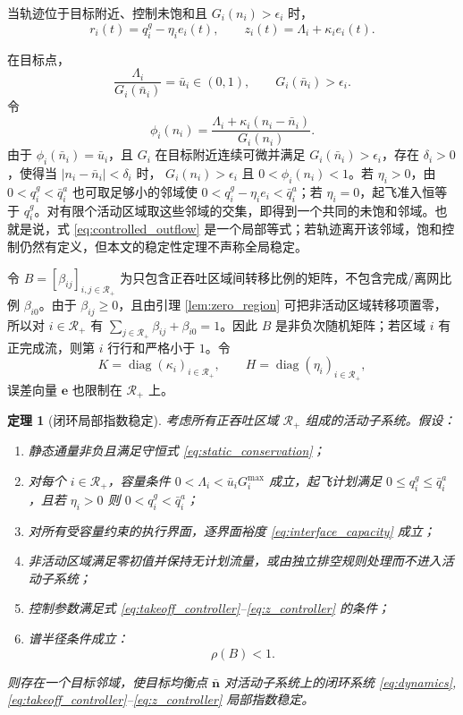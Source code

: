 \documentclass[a4paper,12pt]{article}
\theoremstyle{plain}
\newtheorem{theorem}{定理}[section]
\theoremstyle{definition}
\theoremstyle{remark}
\begin{document}
当轨迹位于目标附近、控制未饱和且 $G_i(n_i)>\epsilon_i$ 时，
\begin{equation}\label{eq:controlled_outflow}
    r_i(t)=q_i^g-\eta_i e_i(t),
    \qquad
    z_i(t)=\Lambda_i+\kappa_i e_i(t).
\end{equation}

在目标点，
\[
    \frac{\Lambda_i}{G_i(\bar n_i)}=\bar u_i\in(0,1),
    \qquad G_i(\bar n_i)>\epsilon_i .
\]
令
\[
    \phi_i(n_i)=\frac{\Lambda_i+\kappa_i(n_i-\bar n_i)}{G_i(n_i)} .
\]
由于 $\phi_i(\bar n_i)=\bar u_i$，且 $G_i$ 在目标附近连续可微并满足 $G_i(\bar n_i)>\epsilon_i$，存在 $\delta_i>0$，使得当 $|n_i-\bar n_i|<\delta_i$ 时，
$G_i(n_i)>\epsilon_i$ 且 $0<\phi_i(n_i)<1$。若 $\eta_i>0$，由 $0<q_i^g<\bar q_i^a$ 也可取足够小的邻域使 $0<q_i^g-\eta_i e_i<\bar q_i^a$；若 $\eta_i=0$，起飞准入恒等于 $q_i^g$。对有限个活动区域取这些邻域的交集，即得到一个共同的未饱和邻域。也就是说，式 \eqref{eq:controlled_outflow} 是一个局部等式；若轨迹离开该邻域，饱和控制仍然有定义，但本文的稳定性定理不声称全局稳定。

令 $B=[\beta_{ij}]_{i,j\in\mathcal R_+}$ 为只包含正吞吐区域间转移比例的矩阵，不包含完成/离网比例 $\beta_{i0}$。由于 $\beta_{ij}\ge0$，且由引理 \ref{lem:zero_region} 可把非活动区域转移项置零，所以对 $i\in\mathcal R_+$ 有 $\sum_{j\in\mathcal R_+}\beta_{ij}+\beta_{i0}=1$。因此 $B$ 是非负次随机矩阵；若区域 $i$ 有正完成流，则第 $i$ 行行和严格小于 $1$。令
\[
    K=\operatorname{diag}(\kappa_i)_{i\in\mathcal R_+},
    \qquad
    H=\operatorname{diag}(\eta_i)_{i\in\mathcal R_+},
\]
误差向量 $\bm e$ 也限制在 $\mathcal R_+$ 上。

\begin{theorem}[闭环局部指数稳定]\label{thm:stability}
考虑所有正吞吐区域 $\mathcal R_+$ 组成的活动子系统。假设：
\begin{enumerate}
    \item 静态通量非负且满足守恒式 \eqref{eq:static_conservation}；
    \item 对每个 $i\in\mathcal R_+$，容量条件 $0<\Lambda_i<\bar u_iG_i^{\max}$ 成立，起飞计划满足 $0\le q_i^g\le \bar q_i^a$，且若 $\eta_i>0$ 则 $0<q_i^g<\bar q_i^a$；
    \item 对所有受容量约束的执行界面，逐界面裕度 \eqref{eq:interface_capacity} 成立；
    \item 非活动区域满足零初值并保持无计划流量，或由独立排空规则处理而不进入活动子系统；
    \item 控制参数满足式 \eqref{eq:takeoff_controller}--\eqref{eq:z_controller} 的条件；
    \item 谱半径条件成立：
    \begin{equation}\label{eq:rho}
        \rho(B)<1 .
    \end{equation}
\end{enumerate}
则存在一个目标邻域，使目标均衡点 $\bar{\bm n}$ 对活动子系统上的闭环系统 \eqref{eq:dynamics}, \eqref{eq:takeoff_controller}--\eqref{eq:z_controller} 局部指数稳定。
\end{theorem}
\end{document}
